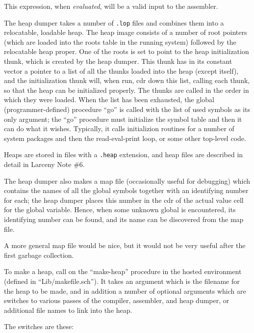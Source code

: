 \noindent This expression, when {\em evaluated}, will be a valid input to the
assembler.

The heap dumper takes a number of {\tt .lop} files and combines them into a
relocatable, loadable heap. The heap image consists of a number of root
pointers (which are loaded into the roots table in the running system)
followed by the relocatable heap proper. One of the roots is set to point to
the heap initialization thunk, which is created by the heap dumper. This
thunk has in its constant vector a pointer to a list of all the thunks
loaded into the heap (except itself), and the initialization thunk will,
when run, cdr down this list, calling each thunk, so that the heap can be
initialized properly. The thunks are called in the order in which they were
loaded. When the list has been exhausted, the global (programmer-defined)
procedure ``go'' is called with the list of used symbols as its only
argument; the ``go'' procedure must initialize the symbol table and then it
can do what it wishes. Typically, it calls initializion routines for a
number of system packages and then the read-eval-print loop, or some other
top-level code.

Heaps are stored in files with a {\tt .heap} extension, and heap files
are described in detail in Larceny Note \#6.

The heap dumper also makes a map file (occasionally useful for
debugging) which contains the names of all the global symbols together
with an identifying number for each; the heap dumper places this
number in the cdr of the actual value cell for the global variable.
Hence, when some unknown global is encountered, its identifying number
can be found, and its name can be discovered from the map file.

A more general map file would be nice, but it would not be very useful
after the first garbage collection.

To make a heap, call on the ``make-heap'' procedure in the hosted
environment (defined in ``Lib/makefile.sch''). It takes an argument which is
the filename for the heap to be made, and in addition a number of optional
arguments which are switches to various passes of the compiler, assembler,
and heap dumper, or additional file names to link into the heap.

The switches are these:

